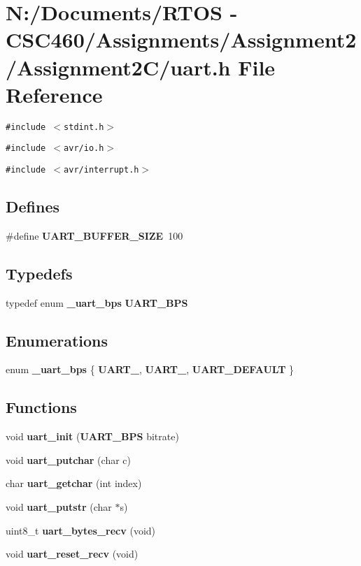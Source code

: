 \section{N:/Documents/RTOS - CSC460/Assignments/Assignment2/Assignment2C/uart.h File Reference}
\label{uart_8h}
{\tt \#include $<$stdint.h$>$}\par
{\tt \#include $<$avr/io.h$>$}\par
{\tt \#include $<$avr/interrupt.h$>$}\par
\subsection*{Defines}
\begin{CompactItemize}
\item 
\#define {\bf UART\_\-BUFFER\_\-SIZE}~100
\end{CompactItemize}
\subsection*{Typedefs}
\begin{CompactItemize}
\item 
typedef enum {\bf \_\-uart\_\-bps} {\bf UART\_\-BPS}
\end{CompactItemize}
\subsection*{Enumerations}
\begin{CompactItemize}
\item 
enum {\bf \_\-uart\_\-bps} \{ {\bf UART\_}, 
{\bf UART\_}, 
{\bf UART\_\-DEFAULT}
 \}
\end{CompactItemize}
\subsection*{Functions}
\begin{CompactItemize}
\item 
void {\bf uart\_\-init} ({\bf UART\_\-BPS} bitrate)
\item 
void {\bf uart\_\-putchar} (char c)
\item 
char {\bf uart\_\-getchar} (int index)
\item 
void {\bf uart\_\-putstr} (char $\ast$s)
\item 
uint8\_\-t {\bf uart\_\-bytes\_\-recv} (void)
\item 
void {\bf uart\_\-reset\_\-recv} (void)
\end{CompactItemize}
